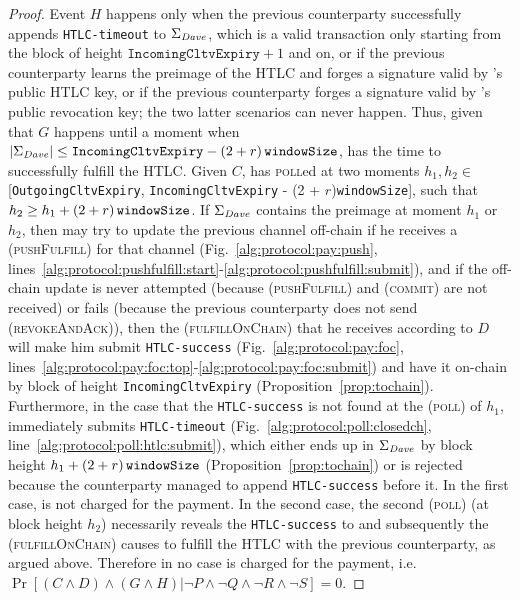 \begin{proof}
  Event $H$ happens only when the previous counterparty successfully appends
  \texttt{HTLC-timeout} to $\Sigma_{\mathit{Dave}}$, which is a valid transaction only
  starting
  from the block of height $\mathtt{IncomingCltvExpiry} + 1$ and on, or if the
  previous counterparty learns the preimage of the HTLC and forges a signature
  valid by \dave's public HTLC key, or if the previous counterparty forges a
  signature valid by \dave's public revocation key; the two latter scenarios can
  never happen. Thus, given that $G$ happens until a moment when
  $|\Sigma_{\mathit{Dave}}| \leq \mathtt{IncomingCltvExpiry} - \left(2 + r\right)\texttt{windowSize}{}$, \dave{} has
  the time to successfully fulfill the HTLC. Given $C$, \dave{} has
  \textsc{poll}ed at two moments $h_1, h_2 \in$ [\texttt{OutgoingCltvExpiry},
  \texttt{IncomingCltvExpiry} - (2 + $r$)\texttt{windowSize}], such that $h_2
  \geq h_1 + \left(2 + r\right)\texttt{windowSize}{}$. If $\Sigma_{\mathit{Dave}}$ contains the preimage at moment
  $h_1$ or $h_2$, then \dave{} may try to update the previous channel off-chain
  if he receives a (\textsc{pushFulfill}) for that channel
  (Fig.~\ref{alg:protocol:pay:push},
  lines~\ref{alg:protocol:pushfulfill:start}-\ref{alg:protocol:pushfulfill:submit}),
  and if the off-chain update is never attempted (because (\textsc{pushFulfill})
  and (\textsc{commit}) are not received) or fails (because the previous
  counterparty does not send (\textsc{revokeAndAck})), then the
  (\textsc{fulfillOnChain}) that he receives according to $D$ will make him
  submit \texttt{HTLC-success} (Fig.~\ref{alg:protocol:pay:foc},
  lines~\ref{alg:protocol:pay:foc:top}-\ref{alg:protocol:pay:foc:submit}) and
  have it on-chain by block of height \texttt{IncomingCltvExpiry}
  (Proposition~\ref{prop:tochain}). Furthermore, in the case that the
  \texttt{HTLC-success} is not found at the (\textsc{poll}) of $h_1$, \dave{}
  immediately submits \texttt{HTLC-timeout}
  (Fig.~\ref{alg:protocol:poll:closedch},
  line~\ref{alg:protocol:poll:htlc:submit}), which either ends up in
  $\Sigma_{\mathit{Dave}}$ by block height $h_1 + \left(2 + r\right)\texttt{windowSize}{}$
  (Proposition~\ref{prop:tochain}) or is rejected because the counterparty
  managed to append \texttt{HTLC-success} before it. In the first case, \dave{}
  is not charged for the payment. In the second case, the second (\textsc{poll})
  (at block height $h_2$) necessarily reveals the \texttt{HTLC-success} to
  \dave{} and subsequently the (\textsc{fulfillOnChain}) causes \dave{} to
  fulfill the HTLC with the previous counterparty, as argued above. Therefore in
  no case \dave{} is charged for the payment, i.e.\ $\Pr[(C \wedge D) \wedge (G
  \wedge H) | \neg P \wedge \neg Q \wedge \neg R \wedge \neg S] = 0$.


\end{proof}
